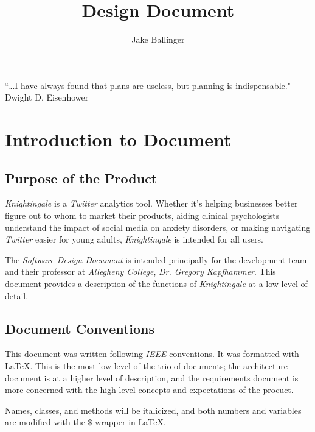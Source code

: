\documentclass[a4paper, 12pt]{article}
\title{Design Document}
\author{Jake Ballinger}
\begin{document}
\maketitle

\begin{center}
\centering  ``...I have always found that plans are useless, but planning is indispensable." \newline
\centering - Dwight D. Eisenhower
\end{center}

\section{Introduction to Document} \label{sec:intro}
\subsection{Purpose of the Product} \label{sec:purpose}
\begin{adjustwidth}{2em}{0pt}
\textit{Knightingale} is a \textit{Twitter} analytics tool. Whether it's helping businesses better figure out to whom to market their products, aiding clinical psychologists understand the impact of social media on anxiety disorders, or making navigating \textit{Twitter} easier for young adults, \textit{Knightingale} is intended for all users. \newline

\noindent The \textit{Software Design Document} is intended principally for the development team and their professor at \textit{Allegheny College}, \textit{Dr. Gregory Kapfhammer}. This document provides a description of the functions of \textit{Knightingale} at a low-level of detail.
\end{adjustwidth}

\subsection{Document Conventions} \label{sec:conventions}
\begin{adjustwidth}{2em}{0pt}
This document was written following \textit{IEEE} conventions. It was formatted with \LaTeX. This is the most low-level of the trio of documents; the architecture document is at a higher level of description, and the requirements document is more concerned with the high-level concepts and expectations of the procuct. \newline

\noindent Names, classes, and methods will be italicized, and both numbers and variables are modified with the $\$$ wrapper in \LaTeX.
\end{adjustwidth}
\end{document}
